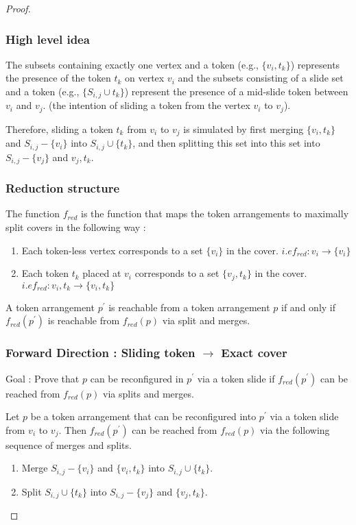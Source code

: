 \begin{proof}
\subsubsection{High level idea}
The subsets containing exactly one vertex and a token (e.g., $\{v_i, t_k\}$) represents the presence of the token $t_k$ on vertex $v_i$ and the subsets consisting of a slide set and a token (e.g., $\{S_{i,j} \cup t_k\}$) represent the presence of a mid-slide token between $v_i$ and $v_j$. (the intention of sliding a token from the vertex $v_i$ to $v_j$).

Therefore, sliding a token $t_k$ from $v_i$ to $v_j$ is simulated by first merging $\{v_i, t_k\}$ and $S_{i,j} - \{v_i\}$ into $S_{i,j} \cup \{t_k\}$, and then splitting this set into this set into $S_{i,j} - \{v_j\}$ and ${v_j, t_k}$.

\subsubsection{Reduction structure}
The function $f_{red}$ is the function that maps the token arrangements to maximally split covers in the following way :
\begin{enumerate}
  \item Each token-less vertex corresponds to a set $\{v_i\}$ in the cover. $i.e f_{red} : v_i \rightarrow \{v_i\}$
  \item Each token $t_k$ placed at $v_i$ corresponds to a set $\{v_j, t_k\}$ in the cover. $i.e f_{red} : v_i, t_k \rightarrow \{v_i, t_k\}$ 
\end{enumerate}

\begin{claim} A token arrangement $p^{'}$ is reachable from a token arrangement $p$ if and only if $f_{red}(p^{'})$ is reachable from $f_{red}(p)$ via split and merges.
\end{claim}

\subsubsection{Forward Direction : Sliding token $\rightarrow$ Exact cover}
Goal : Prove that $p$ can be reconfigured in $p^{'}$ via a token slide if $f_{red}(p^{'})$ can be reached from $f_{red}(p)$ via splits and merges. 

Let $p$ be a token arrangement that can be reconfigured into $p^{'}$ via a token slide from $v_i$ to $v_j$. Then $f_{red}(p^{'})$ can be reached from $f_{red}(p)$ via the following sequence of merges and splits.
\begin{enumerate}
  \item Merge $S_{i,j} - \{v_i\}$ and $\{v_i, t_k\}$ into $S_{i,j} \cup \{t_k\}$.
  \item Split $S_{i,j} \cup \{t_k\}$ into $S_{i,j} - \{v_j\}$ and $\{v_j, t_k\}$.
\end{enumerate}


\end{proof}
